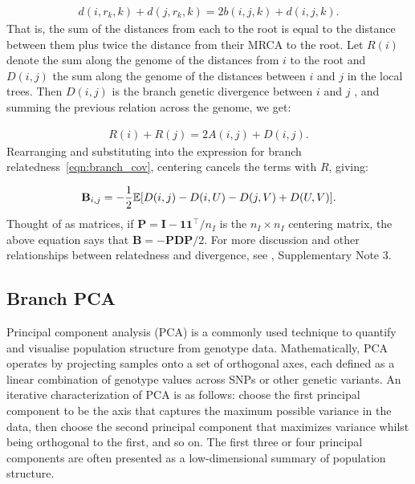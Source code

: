 \begin{align}
    d(i,r_k,k) + d(j,r_k,k) = 2 b(i,j,k) + d(i,j,k) .
\end{align}
%
That is, the sum of the distances from each to the root is
equal to the distance between them plus twice the distance from their MRCA to the root.
%
Let $R(i)$ denote the sum along the genome of the distances from $i$ to the root and
$D(i,j)$ the sum along the genome of the distances between $i$ and $j$ in the local trees.
%
Then $D(i,j)$ is the branch genetic divergence between $i$ and $j$ \citep{ralph2020efficiently},
and summing the previous relation across the genome, we get:
%

\begin{align} \label{eqn:divergence_relatedness}
    R(i) + R(j) = 2 A(i,j) + D(i,j) .
\end{align}
%
Rearranging and substituting into the expression for branch relatedness~\eqref{eqn:branch_cov},
centering cancels the terms with $R$, giving:
%

\begin{align}\label{eqn:divergence_relatedness_branch}
    \mathbf{B}_{i,j} = - \frac{1}{2} \mathbb{E}[D(i,j) - D(i,U) - D(j,V) + D(U,V)] .
\end{align}
%
Thought of as matrices, if $\mathbf{P}=\mathbf{I} - \mathbf{1}\mathbf{1}^\intercal / n_I$ is the $n_I \times n_I$
centering matrix, the above equation says that $\mathbf{B} = - \mathbf{P} \mathbf{D} \mathbf{P} / 2$.
For more discussion and other relationships between relatedness and divergence,
see \citet{zhang2023biobank}, Supplementary Note 3.

\subsection{Branch PCA}

Principal component analysis (PCA) is a commonly used technique to quantify and visualise population structure from genotype data. Mathematically, PCA operates by projecting samples onto a set of orthogonal axes, each defined as a linear combination of genotype values across SNPs or other genetic variants. An iterative characterization of PCA is as follows: choose the first principal component to be the axis that captures the maximum possible variance in the data, then choose the second principal component that maximizes variance whilst being orthogonal to the first, and so on. The first three or four principal components are often presented as a low-dimensional summary of population structure.

